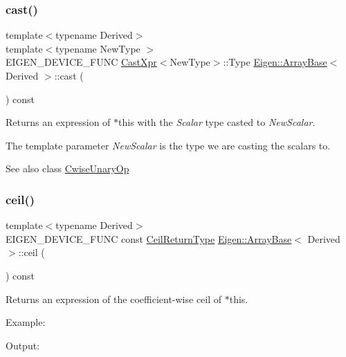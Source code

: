 \subsubsection{\texorpdfstring{cast()}{cast()}}
{\footnotesize\ttfamily template$<$typename Derived$>$ \\
template$<$typename New\+Type $>$ \\
E\+I\+G\+E\+N\+\_\+\+D\+E\+V\+I\+C\+E\+\_\+\+F\+U\+NC \mbox{\hyperlink{struct_eigen_1_1_array_base_1_1_cast_xpr}{Cast\+Xpr}}$<$New\+Type$>$\+::Type \mbox{\hyperlink{class_eigen_1_1_array_base}{Eigen\+::\+Array\+Base}}$<$ Derived $>$\+::cast (\begin{DoxyParamCaption}{ }\end{DoxyParamCaption}) const\hspace{0.3cm}{\ttfamily [inline]}}

\begin{DoxyReturn}{Returns}
an expression of {\ttfamily $\ast$this} with the {\itshape Scalar} type casted to {\itshape New\+Scalar}.
\end{DoxyReturn}
The template parameter {\itshape New\+Scalar} is the type we are casting the scalars to.\begin{DoxySeeAlso}{See also}
class \mbox{\hyperlink{class_eigen_1_1_cwise_unary_op}{Cwise\+Unary\+Op}} 
\end{DoxySeeAlso}
\mbox{\label{class_eigen_1_1_array_base_a644fa9e672def0cd2bdab1f4efe6400e}} 
\subsubsection{\texorpdfstring{ceil()}{ceil()}}
{\footnotesize\ttfamily template$<$typename Derived$>$ \\
E\+I\+G\+E\+N\+\_\+\+D\+E\+V\+I\+C\+E\+\_\+\+F\+U\+NC const \mbox{\hyperlink{class_eigen_1_1_cwise_unary_op}{Ceil\+Return\+Type}} \mbox{\hyperlink{class_eigen_1_1_array_base}{Eigen\+::\+Array\+Base}}$<$ Derived $>$\+::ceil (\begin{DoxyParamCaption}{ }\end{DoxyParamCaption}) const\hspace{0.3cm}{\ttfamily [inline]}}

\begin{DoxyReturn}{Returns}
an expression of the coefficient-\/wise ceil of $\ast$this.
\end{DoxyReturn}
Example\+: 
\begin{DoxyCodeInclude}{0}
\end{DoxyCodeInclude}
 Output\+: 
\begin{DoxyVerbInclude}
\end{DoxyVerbInclude}


